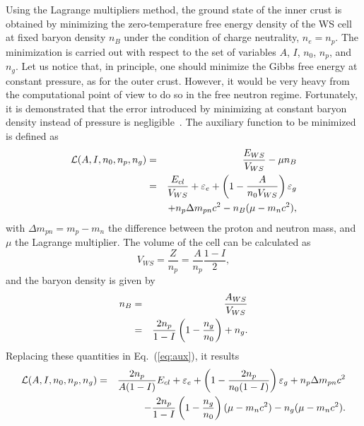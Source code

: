 Using the Lagrange multipliers method, the ground state of the inner crust is
obtained by minimizing the zero-temperature free
energy density of the WS cell at fixed baryon density $n_B$ under the condition 
of charge neutrality, $n_e = n_p$. The minimization is carried out with 
respect to the set of variables $A$, $I$, $n_0$, $n_p$, and $n_g$.
Let us notice that, in principle, one should minimize the Gibbs free energy at 
constant pressure, as for the outer crust. However, it would be very heavy from 
the computational point of view to do so in the free neutron regime.
Fortunately, it is demonstrated that the error introduced by minimizing at
constant baryon density instead of pressure is negligible~\cite{Pearson2012}.
The auxiliary function to be minimized is defined as
%
\begin{eqnarray}
  \mathcal{L}(A,I,n_0,n_p,n_g) &=& \frac{E_{WS}}{V_{WS}} - \mu n_B \notag \\
                      &=& \frac{E_{cl}}{V_{WS}} + \varepsilon_e +
              \left(1-\frac{A}{n_0V_{WS}}\right)\varepsilon_g \notag\\
                      &&+ n_p \Delta m_{pn}c^2 - n_B(\mu -
                      m_nc^2),\label{eq:aux}
\end{eqnarray}
%
with $\Delta m_{pn} = m_p - m_n$ the difference between the proton and neutron
mass, and $\mu$ the Lagrange multiplier. 
The volume of the cell can be calculated as
%
\begin{equation}
  V_{WS} = \frac{Z}{n_p} = \frac{A}{n_p}\frac{1-I}{2},
\end{equation}
%
and the baryon density is given by 
%
\begin{eqnarray}
  n_B &=& \frac{A_{WS}}{V_{WS}} \notag\\
      &=& \frac{2n_p}{1-I}\left(1-\frac{n_g}{n_0}\right) + n_g.
\end{eqnarray}
%
Replacing these quantities in Eq.~(\ref{eq:aux}), it results
%
\begin{eqnarray}
  \mathcal{L}(A,I,n_0,n_p,n_g) &=& \frac{2n_p}{A(1-I)}E_{cl} + \varepsilon_e +
  \left(1-\frac{2n_p}{n_0(1-I)}\right)\varepsilon_g 
                      + n_p \Delta m_{pn}c^2 \notag\\
                      &&- \frac{2n_p}{1-I}\left(1-\frac{n_g}{n_0}\right)(\mu - m_nc^2)
                      - n_g(\mu - m_nc^2).\label{eq:aux_final}
\end{eqnarray}
%

